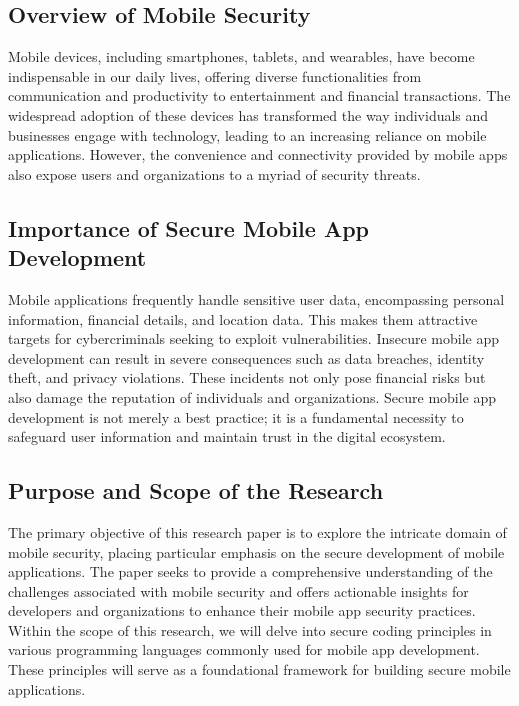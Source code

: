 \documentclass[conference]{IEEEtran}
\begin{document}
\subsection{Overview of Mobile Security}

Mobile devices, including smartphones, tablets, and wearables, have become indispensable in our daily lives, offering diverse functionalities from communication and productivity to entertainment and financial transactions. The widespread adoption of these devices has transformed the way individuals and businesses engage with technology, leading to an increasing reliance on mobile applications. However, the convenience and connectivity provided by mobile apps also expose users and organizations to a myriad of security threats.

\subsection{Importance of Secure Mobile App Development}

Mobile applications frequently handle sensitive user data, encompassing personal information, financial details, and location data. This makes them attractive targets for cybercriminals seeking to exploit vulnerabilities. Insecure mobile app development can result in severe consequences such as data breaches, identity theft, and privacy violations. These incidents not only pose financial risks but also damage the reputation of individuals and organizations. Secure mobile app development is not merely a best practice; it is a fundamental necessity to safeguard user information and maintain trust in the digital ecosystem.

\subsection{Purpose and Scope of the Research}

The primary objective of this research paper is to explore the intricate domain of mobile security, placing particular emphasis on the secure development of mobile applications. The paper seeks to provide a comprehensive understanding of the challenges associated with mobile security and offers actionable insights for developers and organizations to enhance their mobile app security practices. Within the scope of this research, we will delve into secure coding principles in various programming languages commonly used for mobile app development. These principles will serve as a foundational framework for building secure mobile applications.
\end{document}
